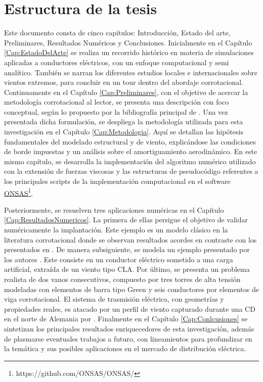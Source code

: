 \section{Estructura de la tesis}

Este documento consta de cinco capítulos: Introducción, Estado del arte, Preliminares, Resultados Numéricos y Conclusiones. Inicialmente en el Capítulo \ref{Cap:EstadoDelArte} se realiza un recorrido histórico en materia de simulaciones aplicadas a conductores eléctricos, con un enfoque computacional y semi analítico. También se narran los diferentes estudios locales e internacionales sobre vientos extremos, para concluir en un tour dentro del abordaje corrotacional. Continuamente en el Capítulo \ref{Cap:Preliminares}, con el objetivo de acercar la metodología corrotacional al lector, se presenta una descripción con foco conceptual, según lo propuesto por la bibliografía principal de \citet{Le2014}. Una vez presentada dicha formulación, se despliega la metodología utilizada para esta investigación en el Capítulo \ref{Cap:Metodologia}. Aquí se detallan las hipótesis fundamentales del modelado estructural y de viento, explicándose las condiciones de borde impuestas y un análisis sobre el amortiguamiento aerodinámico. En este mismo capítulo, se desarrolla la implementación del algoritmo numérico utilizado con la extensión de fuerzas viscosas y las estructuras de pseudocódigo referentes a los principales scripts de la implementación computacional en el software \href{https://github.com/ONSAS/ONSAS/}{ONSAS}\footnote{https://github.com/ONSAS/ONSAS/}. 


Posteriormente, se resuelven tres aplicaciones numéricas en el Capítulo \ref{Cap:ResultadosNumericos}. La primera de ellas persigue el objetivo de validar numéricamente la implantación. Este ejemplo es un modelo clásico en la literatura corrotacional donde se observan resultados acordes en contraste con los presentados en \cite{Le2014}. De manera subsiguiente, se modela un ejemplo presentado por los autores \cite{Foti2016}. Este consiste en un conductor eléctrico sometido a una carga artificial, extraída de un viento tipo \gls{CLA}. Por último, se presenta un problema realista de dos vanos consecutivos, compuesto por tres torres de alta tensión modeladas con elementos de barra tipo Green y seis conductores por elementos de viga corrotacional. El sistema de trasmisión eléctrica, con geometrías y propiedades reales, es atacado por un perfil de viento capturado durante una CD en el norte de Alemania por \cite{stengel2017measurements}. Finalmente en el Capítulo \ref{Cap:Conlcusiones} se sintetizan los principales resultados enriquecedores de esta investigación, además de plasmarse eventuales trabajos a futuro, con lineamientos para profundizar en la temática y sus posibles aplicaciones en el mercado de distribución eléctrica.
